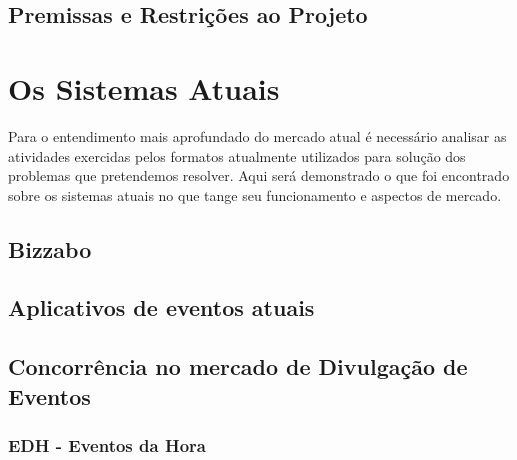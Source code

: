 \documentclass[12pt,a4paper,twoside,hyphens,english,brazil]{abntex2}
\begin{document}
\section{Premissas e Restrições ao Projeto}

\chapter{Os Sistemas Atuais}
Para o entendimento mais aprofundado do mercado atual é necessário analisar as atividades exercidas pelos formatos atualmente utilizados para solução dos problemas que pretendemos resolver. Aqui será demonstrado o que foi encontrado sobre os sistemas atuais no que tange seu funcionamento e aspectos de mercado.

\section{Bizzabo} \label{sec:sistemas:bizzabo}

\section{Aplicativos de eventos atuais} \label{sec:sistemas:apps_privados}

\section{Concorrência no mercado de Divulgação de Eventos} \label{sec:sistemas:divulgacao}

\subsection{EDH - Eventos da Hora}
\end{document}
